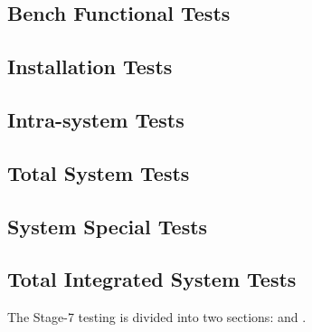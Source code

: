 \subsection{Bench Functional Tests}
\label{loc:StageTwo}
\renewcommand{\TestIdName}{StageTwo}%
\renewcommand{\TestIdNameX}{StageTwo\xspace}%


\subsection{Installation Tests}
\label{loc:StageThree}
\renewcommand{\TestIdName}{StageThree}%
\renewcommand{\TestIdNameX}{StageThree\xspace}%


\subsection{Intra-system Tests}
\label{loc:StageFour}
\renewcommand{\TestIdName}{StageFour}%
\renewcommand{\TestIdNameX}{StageFour\xspace}%


\subsection{Total System Tests}
\label{loc:StageFive}
\renewcommand{\TestIdName}{StageFive}%
\renewcommand{\TestIdNameX}{StageFive\xspace}%


\subsection{System Special Tests}
\label{loc:StageSix}
\renewcommand{\TestIdName}{StageSix}%
\renewcommand{\TestIdNameX}{StageSix\xspace}%


\subsection{Total Integrated System Tests}
\label{loc:StageSeven}
\renewcommand{\TestIdName}{StageSeven}%
\renewcommand{\TestIdNameX}{StageSeven\xspace}%

The Stage-7 testing is divided into two sections: \StageDT and \StageOT.

